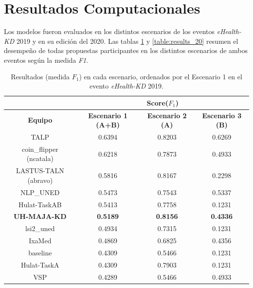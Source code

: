 \section{Resultados Computacionales}

Los modelos fueron evaluados en los distintos escenarios de los eventos \textit{eHealth-KD} 2019 y en su edición del 2020.
Las tablas  \ref{table:results_19} y \ref{table:results_20} resumen el desempeño de todas propuestas participantes en los distintos escenarios de ambos eventos seg\'un la medida \emph{F1}. 

\begin{table}[tb!]\centering
	\caption{Resultados (medida $F_1$) en cada escenario, ordenados por el Escenario 1 en el evento \textit{eHealth-KD} 2019. \label{table:results_19}}
	\begin{tabular}{|c|c|c|c|}
		\hline
		&  \multicolumn{3}{c|}{\textbf{Score($F_1$)}} \\
		\hline
		\textbf{Equipo} & \textbf{Escenario 1 (A+B)} & \textbf{Escenario 2 (A)} & \textbf{Escenario 3 (B)} \\
		\hline
		TALP	          	   &  0.6394 &  0.8203 &  0.6269 \\
		coin\_flipper (ncatala) & 0.6218 &  0.7873 &  0.4933 \\	
		LASTUS-TALN (abravo)   & 0.5816 &  0.8167 &  0.2298	\\
		NLP\_UNED               & 0.5473 &  0.7543 &  0.5337 \\
		Hulat-TaskAB           & 0.5413 &  0.7758 &  0.1231 \\	
		\textbf{UH-MAJA-KD}    & \textbf{0.5189} &  \textbf{0.8156} &  \textbf{0.4336} \\	
		lsi2\_uned              & 0.4934 &  0.7315 &  0.1231	\\
		IxaMed                 & 0.4869 &  0.6825 &  0.4356 \\
		baseline               & 0.4309 &  0.5466 &  0.1231 \\
		Hulat-TaskA            & 0.4309 &  0.7903 &  0.1231 \\	
		VSP             	   & 0.4289 &  0.5466 &  0.4933 \\	
		\hline
	\end{tabular}
\end{table}

